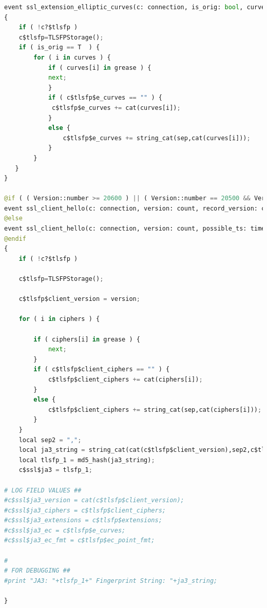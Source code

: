 \begin{lstlisting}[language=Python, caption=JA3 Fingerprinting Zeek Script]
event ssl_extension_elliptic_curves(c: connection, is_orig: bool, curves: index_vec)
{
    if ( !c?$tlsfp )
    c$tlsfp=TLSFPStorage();
    if ( is_orig == T  ) {
        for ( i in curves ) {
            if ( curves[i] in grease ) {
            next;
            }
            if ( c$tlsfp$e_curves == "" ) {
             c$tlsfp$e_curves += cat(curves[i]);
            }
            else {
                c$tlsfp$e_curves += string_cat(sep,cat(curves[i]));
            }
        }
   }
}

@if ( ( Version::number >= 20600 ) || ( Version::number == 20500 && Version::info$commit >= 944 ) )
event ssl_client_hello(c: connection, version: count, record_version: count, possible_ts: time, client_random: string, session_id: string, ciphers: index_vec, comp_methods: index_vec) &priority=1
@else
event ssl_client_hello(c: connection, version: count, possible_ts: time, client_random: string, session_id: string, ciphers: index_vec) &priority=1
@endif
{
    if ( !c?$tlsfp )

    c$tlsfp=TLSFPStorage();

    c$tlsfp$client_version = version;

    for ( i in ciphers ) {

        if ( ciphers[i] in grease ) {
            next;
        }
        if ( c$tlsfp$client_ciphers == "" ) { 
            c$tlsfp$client_ciphers += cat(ciphers[i]);
        }
        else {
            c$tlsfp$client_ciphers += string_cat(sep,cat(ciphers[i]));
        }
    }
    local sep2 = ",";
    local ja3_string = string_cat(cat(c$tlsfp$client_version),sep2,c$tlsfp$client_ciphers,sep2,c$tlsfp$extensions,sep2,c$tlsfp$e_curves,sep2,c$tlsfp$ec_point_fmt);
    local tlsfp_1 = md5_hash(ja3_string);
    c$ssl$ja3 = tlsfp_1;

# LOG FIELD VALUES ##
#c$ssl$ja3_version = cat(c$tlsfp$client_version);
#c$ssl$ja3_ciphers = c$tlsfp$client_ciphers;
#c$ssl$ja3_extensions = c$tlsfp$extensions;
#c$ssl$ja3_ec = c$tlsfp$e_curves;
#c$ssl$ja3_ec_fmt = c$tlsfp$ec_point_fmt;

#
# FOR DEBUGGING ##
#print "JA3: "+tlsfp_1+" Fingerprint String: "+ja3_string;

}
\end{lstlisting}

